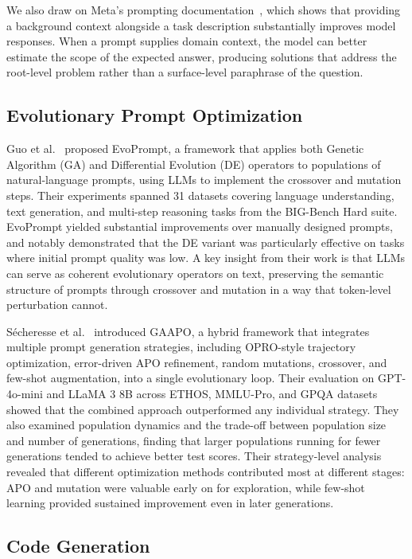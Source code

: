 \documentclass[conference]{IEEEtran}
\begin{document}
We also draw on Meta's prompting documentation~\cite{meta2024prompting}, which shows that
providing a background context alongside a task description substantially improves model
responses. When a prompt supplies domain context, the model can better estimate the scope
of the expected answer, producing solutions that address the root-level problem rather
than a surface-level paraphrase of the question.

\subsection{Evolutionary Prompt Optimization}

Guo et al.~\cite{guo2024evoprompt} proposed EvoPrompt, a framework that applies both
Genetic Algorithm (GA) and Differential Evolution (DE) operators to populations of
natural-language prompts, using LLMs to implement the crossover and mutation steps. Their
experiments spanned 31 datasets covering language understanding, text generation, and
multi-step reasoning tasks from the BIG-Bench Hard suite. EvoPrompt yielded substantial
improvements over manually designed prompts, and notably demonstrated that the DE variant
was particularly effective on tasks where initial prompt quality was low. A key insight
from their work is that LLMs can serve as coherent evolutionary operators on text,
preserving the semantic structure of prompts through crossover and mutation in a way that
token-level perturbation cannot.

S\'{e}cheresse et al.~\cite{secheresse2025gaapo} introduced GAAPO, a hybrid framework
that integrates multiple prompt generation strategies, including OPRO-style trajectory
optimization, error-driven APO refinement, random mutations, crossover, and few-shot
augmentation, into a single evolutionary loop. Their evaluation on GPT-4o-mini and LLaMA
3 8B across ETHOS, MMLU-Pro, and GPQA datasets showed that the combined approach outperformed
any individual strategy. They also examined population dynamics and the trade-off between
population size and number of generations, finding that larger populations running for fewer
generations tended to achieve better test scores. Their strategy-level analysis revealed that
different optimization methods contributed most at different stages: APO and mutation were
valuable early on for exploration, while few-shot learning provided sustained improvement
even in later generations.

\subsection{Code Generation}
\end{document}
